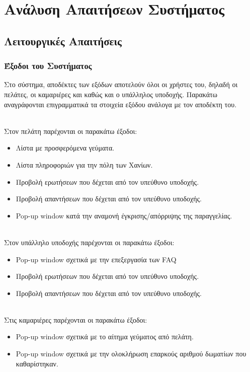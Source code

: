 \chapter{Ανάλυση Απαιτήσεων Συστήματος}

\section{Λειτουργικές Απαιτήσεις}
\label{3.1}
\subsection{Έξοδοι του Συστήματος}
Στο σύστημα, αποδέκτες των εξόδων αποτελούν όλοι οι χρήστες του, δηλαδή οι πελάτες, οι καμαριέρες 
και καθώς και ο υπάλληλος υποδοχής. Παρακάτω αναγράφονται επιγραμματικά τα στοιχεία εξόδου 
ανάλογα με τον αποδέκτη του. 

\noindent \\ 
Στον πελάτη παρέχονται οι παρακάτω έξοδοι:
\begin{itemize}
	\item  Λίστα με προσφερόμενα γεύματα.
	\item  Λίστα πληροφοριών για την πόλη των Χανίων.
	\item  Προβολή ερωτήσεων που δέχεται από τον υπεύθυνο υποδοχής.
	\item  Προβολή απαντήσεων  που δέχεται από τον υπεύθυνο υποδοχής.		
	\item  Pop-up window κατά την αναμονή έγκρισης/απόρριψης της παραγγελίας.
\end{itemize}

\noindent \\
Στον υπάλληλο υποδοχής παρέχονται οι παρακάτω έξοδοι:
\begin{itemize}
	\item  Pop-up window σχετικά με την επεξεργασία των FAQ
	\item Προβολή ερωτήσεων που δέχεται από τον υπεύθυνο υποδοχής.
	\item Προβολή απαντήσεων  που δέχεται από τον υπεύθυνο υποδοχής.	
\end{itemize}

\noindent \\ 
Στις καμαριέρες παρέχονται οι παρακάτω έξοδοι:
\begin{itemize}
	\item  Pop-up window σχετικά με το αίτημα γεύματος από πελάτη.
	\item  Pop-up window σχετικά με την ολοκλήρωση  επαρκούς αριθμού δωματίων που καθαρίστηκαν.
\end{itemize}

